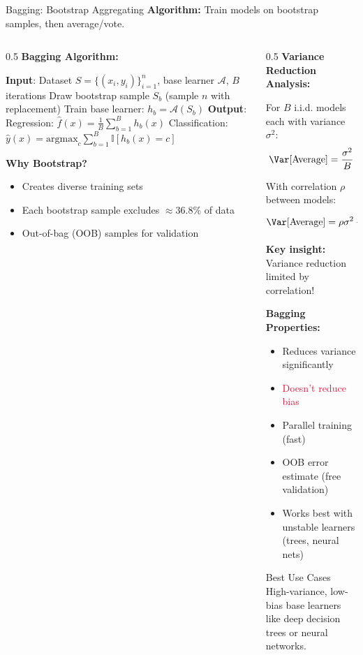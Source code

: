 \begin{frame}{Bagging: Bootstrap Aggregating}
\textbf{Algorithm:} Train models on bootstrap samples, then average/vote.

\begin{columns}
\begin{column}{0.5\textwidth}
\textbf{Bagging Algorithm:}

\begin{algorithm}[H]
\caption{Bagging}
\begin{algorithmic}[1]
\STATE \textbf{Input}: Dataset $S = \{(x_i, y_i)\}_{i=1}^n$, base learner $\mathcal{A}$, $B$ iterations
\STATE Draw bootstrap sample $S_b$ (sample $n$ with replacement)
\STATE Train base learner: $h_b = \mathcal{A}(S_b)$
\ENDFOR
\STATE \textbf{Output}:
\STATE \quad Regression: $\hat{f}(x) = \frac{1}{B}\sum_{b=1}^B h_b(x)$
\STATE \quad Classification: $\hat{y}(x) = \text{argmax}_c \sum_{b=1}^B \mathbb{I}[h_b(x) = c]$
\end{algorithmic}
\end{algorithm}

\textbf{Why Bootstrap?}
\begin{itemize}
\item Creates diverse training sets
\item Each bootstrap sample excludes $\approx 36.8\%$ of data
\item Out-of-bag (OOB) samples for validation
\end{itemize}
\end{column}
\begin{column}{0.5\textwidth}
\textbf{Variance Reduction Analysis:}

For $B$ i.i.d. models each with variance $\sigma^2$:
\[\Var[\text{Average}] = \frac{\sigma^2}{B}\]

With correlation $\rho$ between models:
\[\Var[\text{Average}] = \rho\sigma^2 + \frac{1-\rho}{B}\sigma^2\]

\textbf{Key insight:} Variance reduction limited by correlation!

\vspace{0.3cm}
\textbf{Bagging Properties:}
\begin{itemize}
\item \textcolor{forest}{Reduces variance} significantly
\item \textcolor{crimson}{Doesn't reduce bias}
\item \textcolor{forest}{Parallel training} (fast)
\item \textcolor{forest}{OOB error estimate} (free validation)
\item Works best with unstable learners (trees, neural nets)
\end{itemize}

\begin{alertblock}{Best Use Cases}
High-variance, low-bias base learners like deep decision trees or neural networks.
\end{alertblock}
\end{column}
\end{columns}
\end{frame}

